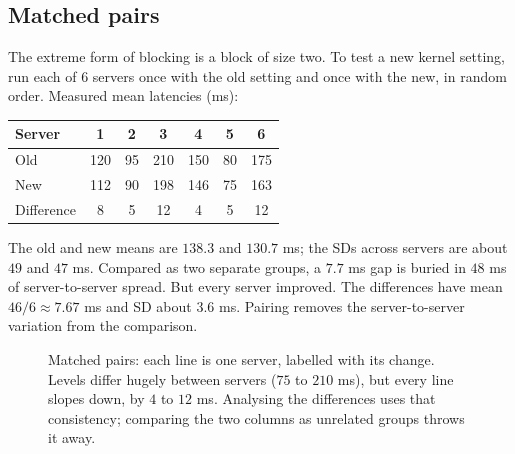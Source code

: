 \subsection{Matched pairs}

The extreme form of blocking is a block of size two. To test a new kernel setting, run
each of $6$ servers once with the old setting and once with the new, in random order.
Measured mean latencies (ms):

\begin{center}
\renewcommand{\arraystretch}{1.15}
\begin{tabular}{@{}lcccccc@{}}
\toprule
Server & 1 & 2 & 3 & 4 & 5 & 6 \\
\midrule
Old & 120 & 95 & 210 & 150 & 80 & 175 \\
New & 112 & 90 & 198 & 146 & 75 & 163 \\
Difference & 8 & 5 & 12 & 4 & 5 & 12 \\
\bottomrule
\end{tabular}
\end{center}

The old and new means are $138.3$ and $130.7$ ms; the SDs across servers are about $49$
and $47$ ms. Compared as two separate groups, a $7.7$ ms gap is buried in $48$ ms of
server-to-server spread. But every server improved. The differences have mean
$46/6 \approx 7.67$ ms and SD about $3.6$ ms. Pairing removes the server-to-server
variation from the comparison.

\begin{figure}[H]
\centering
{}
\caption{Matched pairs: each line is one server, labelled with its change. Levels differ
hugely between servers ($75$ to $210$ ms), but every line slopes down, by $4$ to $12$ ms.
Analysing the differences uses that consistency; comparing the two columns as unrelated
groups throws it away.}
\label{fig:sampling-pairs}
\end{figure}

